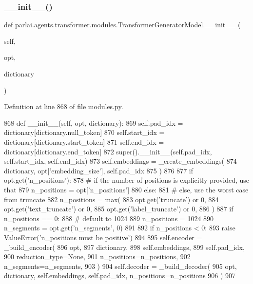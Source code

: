 \subsubsection{\texorpdfstring{\+\_\+\+\_\+init\+\_\+\+\_\+()}{\_\_init\_\_()}}
{\footnotesize\ttfamily def parlai.\+agents.\+transformer.\+modules.\+Transformer\+Generator\+Model.\+\_\+\+\_\+init\+\_\+\+\_\+ (\begin{DoxyParamCaption}\item[{}]{self,  }\item[{}]{opt,  }\item[{}]{dictionary }\end{DoxyParamCaption})}



Definition at line 868 of file modules.\+py.


\begin{DoxyCode}
868     \textcolor{keyword}{def }\_\_init\_\_(self, opt, dictionary):
869         self.pad\_idx = dictionary[dictionary.null\_token]
870         self.start\_idx = dictionary[dictionary.start\_token]
871         self.end\_idx = dictionary[dictionary.end\_token]
872         super().\_\_init\_\_(self.pad\_idx, self.start\_idx, self.end\_idx)
873         self.embeddings = \_create\_embeddings(
874             dictionary, opt[\textcolor{stringliteral}{'embedding\_size'}], self.pad\_idx
875         )
876 
877         \textcolor{keywordflow}{if} opt.get(\textcolor{stringliteral}{'n\_positions'}):
878             \textcolor{comment}{# if the number of positions is explicitly provided, use that}
879             n\_positions = opt[\textcolor{stringliteral}{'n\_positions'}]
880         \textcolor{keywordflow}{else}:
881             \textcolor{comment}{# else, use the worst case from truncate}
882             n\_positions = max(
883                 opt.get(\textcolor{stringliteral}{'truncate'}) \textcolor{keywordflow}{or} 0,
884                 opt.get(\textcolor{stringliteral}{'text\_truncate'}) \textcolor{keywordflow}{or} 0,
885                 opt.get(\textcolor{stringliteral}{'label\_truncate'}) \textcolor{keywordflow}{or} 0,
886             )
887             \textcolor{keywordflow}{if} n\_positions == 0:
888                 \textcolor{comment}{# default to 1024}
889                 n\_positions = 1024
890         n\_segments = opt.get(\textcolor{stringliteral}{'n\_segments'}, 0)
891 
892         \textcolor{keywordflow}{if} n\_positions < 0:
893             \textcolor{keywordflow}{raise} ValueError(\textcolor{stringliteral}{'n\_positions must be positive'})
894 
895         self.encoder = \_build\_encoder(
896             opt,
897             dictionary,
898             self.embeddings,
899             self.pad\_idx,
900             reduction\_type=\textcolor{keywordtype}{None},
901             n\_positions=n\_positions,
902             n\_segments=n\_segments,
903         )
904         self.decoder = \_build\_decoder(
905             opt, dictionary, self.embeddings, self.pad\_idx, n\_positions=n\_positions
906         )
907 
\end{DoxyCode}



